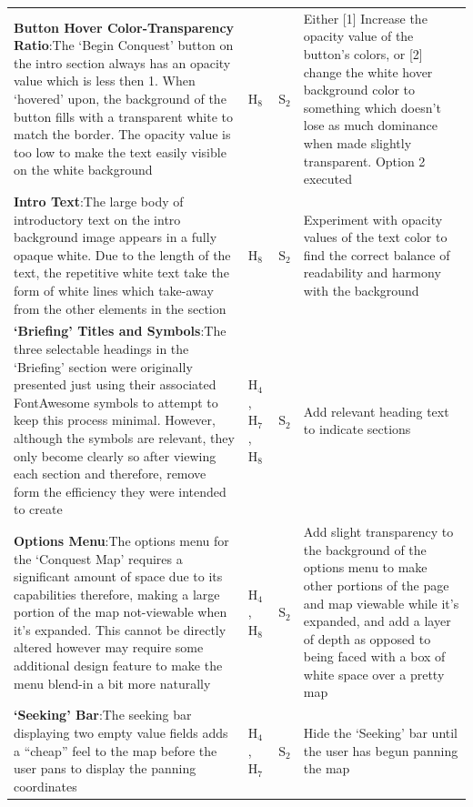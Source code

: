 \documentclass[11pt, english]{article}
\begin{document}
\begin{center}
\begin{longtable}{p{7.5cm}p{0.5cm}p{0.5cm}p{4cm}}
		\textbf{Button Hover Color-Transparency Ratio}:\newline The `Begin Conquest' button on the intro section always has an opacity value which is less then 1. When `hovered' upon, the background of the button fills with a transparent white to match the border. The opacity value is too low to make the text easily visible on the white background & $\mathrm{H_{8}}$ & $\mathrm{S_{2}}$ & Either [1] Increase the opacity value of the button's colors, or [2] change the white hover background color to something which doesn't lose as much dominance when made slightly transparent. Option 2 executed\\
		\textbf{Intro Text}:\newline The large body of introductory text on the intro background image appears in a fully opaque white. Due to the length of the text, the repetitive white text take the form of white lines which take-away from the other elements in the section & $\mathrm{H_{8}}$ & $\mathrm{S_{2}}$ & Experiment with opacity values of the text color to find the correct balance of readability and harmony with the background\\
		\textbf{`Briefing' Titles and Symbols}:\newline The three selectable headings in the `Briefing' section were originally presented just using their associated FontAwesome symbols to attempt to keep this process minimal. However, although the symbols are relevant, they only become clearly so after viewing each section and therefore, remove form the efficiency they were intended to create & $\mathrm{H_{4}}$, $\mathrm{H_{7}}$, $\mathrm{H_{8}}$ & $\mathrm{S_{2}}$ & Add relevant heading text to indicate sections\\
		\textbf{Options Menu}:\newline The options menu for the `Conquest Map' requires a significant amount of space due to its capabilities therefore, making a large portion of the map not-viewable when it's expanded. This cannot be directly altered however may require some additional design feature to make the menu blend-in a bit more naturally & $\mathrm{H_{4}}$, $\mathrm{H_{8}}$ & $\mathrm{S_{2}}$ & Add slight transparency to the background of the options menu to make other portions of the page and map viewable while it's expanded, and add a layer of depth as opposed to being faced with a box of white space over a pretty map\\
		\textbf{`Seeking' Bar}:\newline The seeking bar displaying two empty value fields adds a ``cheap'' feel to the map before the user pans to display the panning coordinates & $\mathrm{H_{4}}$, $\mathrm{H_{7}}$ & $\mathrm{S_{2}}$ & Hide the `Seeking' bar until the user has begun panning the map\\

\end{longtable}
\end{center}
\end{document}
